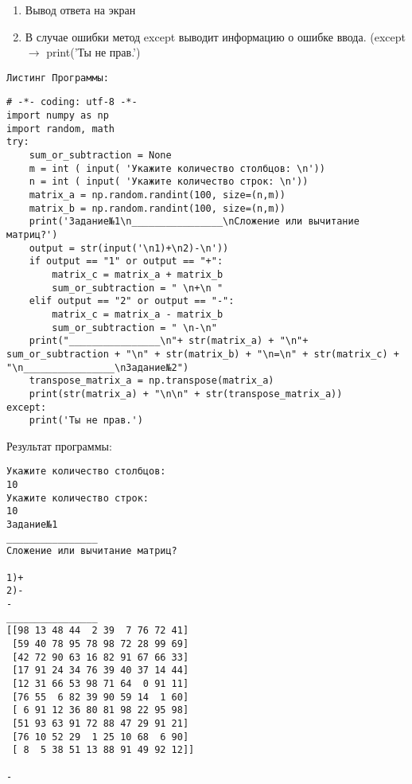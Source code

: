 \documentclass[a4paper]{article}
\begin{document}
\begin{lab5}
\begin{algoritm}
\begin{enumerate}
            \item Вывод ответа на экран
            \item В случае ошибки метод except выводит информацию о ошибке ввода. (except $\to$ print('Ты не прав.')
        \end{enumerate}
    \end{algoritm}
        \texttt{Листинг Программы:}
    \begin{verbatim}
# -*- coding: utf-8 -*-
import numpy as np
import random, math
try:
    sum_or_subtraction = None
    m = int ( input( 'Укажите количество столбцов: \n'))
    n = int ( input( 'Укажите количество строк: \n'))
    matrix_a = np.random.randint(100, size=(n,m))
    matrix_b = np.random.randint(100, size=(n,m))
    print('Задание№1\n________________\nСложение или вычитание матриц?')
    output = str(input('\n1)+\n2)-\n'))
    if output == "1" or output == "+":
        matrix_c = matrix_a + matrix_b
        sum_or_subtraction = " \n+\n "
    elif output == "2" or output == "-":
        matrix_c = matrix_a - matrix_b
        sum_or_subtraction = " \n-\n"
    print("________________\n"+ str(matrix_a) + "\n"+ sum_or_subtraction + "\n" + str(matrix_b) + "\n=\n" + str(matrix_c) + "\n________________\nЗадание№2")
    transpose_matrix_a = np.transpose(matrix_a)
    print(str(matrix_a) + "\n\n" + str(transpose_matrix_a))
except:
    print('Ты не прав.')
    \end{verbatim}
    \begin{center}Результат программы:\end{center}
    \begin{verbatim}
Укажите количество столбцов: 
10
Укажите количество строк: 
10
Задание№1
________________
Сложение или вычитание матриц?

1)+
2)-
-
________________
[[98 13 48 44  2 39  7 76 72 41]
 [59 40 78 95 78 98 72 28 99 69]
 [42 72 90 63 16 82 91 67 66 33]
 [17 91 24 34 76 39 40 37 14 44]
 [12 31 66 53 98 71 64  0 91 11]
 [76 55  6 82 39 90 59 14  1 60]
 [ 6 91 12 36 80 81 98 22 95 98]
 [51 93 63 91 72 88 47 29 91 21]
 [76 10 52 29  1 25 10 68  6 90]
 [ 8  5 38 51 13 88 91 49 92 12]]
 
-


\end{verbatim}
\end{lab5}
\end{document}
